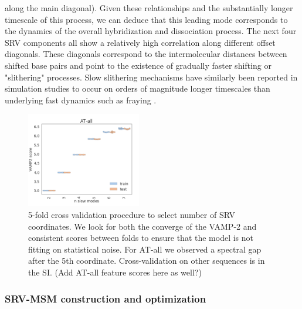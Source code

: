 \documentclass[journal=jpcbfk,manuscript=article]{achemso}
\begin{document}
along the main diagonal). Given these relationships and the substantially longer timescale of this process, we can deduce that this leading mode corresponds to the dynamics of the overall hybridization and dissociation process. The next four SRV components all show a relatively high correlation along different offset diagonals. These diagonals correspond to the intermolecular distances between shifted base pairs and point to the existence of gradually faster shifting or "slithering" processes. Slow slithering mechanisms have similarly been reported in simulation studies to occur on orders of magnitude longer timescales than underlying fast dynamics such as fraying \citep{Markegard2015, Xiao2019, Maciejczyk2014DNAModel}.

\begin{figure}[ht!]
	\begin{center}
        \includegraphics[width=50mm, 
        scale=0.5]{Figs/figs_0804/srv_crossval-AT-all.png}
        \caption{5-fold cross validation procedure to select number of SRV coordinates. We look for both the converge of the VAMP-2 and consistent scores between folds to ensure that the model is not fitting on statistical noise. For AT-all we observed a spectral gap after the 5th coordinate. Cross-validation on other sequences is in the SI. (Add AT-all feature scores here as well?)}
        \label{fig:srv_crossval-AT-all}
	\end{center}
\end{figure}

\subsubsection{\label{sec:Results}SRV-MSM construction and optimization}
\end{document}
